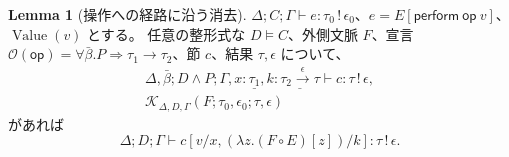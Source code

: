 \documentclass[a4paper,11pt]{article}
\theoremstyle{definition}
\newtheorem{lemma}[definition]{Lemma}
\newcommand{\op}{\mathsf{op}}
\newcommand{\ops}{\mathcal O}
\newcommand{\arr}[3]{#1\xrightarrow{#2}#3}
\newcommand{\jj}[6]{#1;#2;#3\vdash #4:#5\,!\,#6}
\newcommand{\J}[3]{\jj{\Delta}{C}{\Gamma}{#1}{#2}{#3}}
\newcommand{\perform}[2]{\mathsf{perform}\ #1\ #2}
\newcommand{\mono}[1]{\underline{#1}}
\newcommand{\Val}{\operatorname{Value}}
\newcommand{\proofspace}{\Needspace{16\baselineskip}}
\begin{document}
\proofspace
\begin{samepage}
\begin{lemma}[操作への経路に沿う消去]\label{lem:op-elim}
$\J e{\tau_0}{\epsilon_0}$、$e=E[\perform\op v]$、$\Val(v)$ とする。
任意の整形式な $D\models C$、外側文脈 $F$、宣言
$\ops(\op)=\forall\bar\beta.P\Rightarrow\tau_1\to\tau_2$、節 $c$、結果 $\tau,\epsilon$ について、
\begin{gather*}
 \jj{\Delta,\bar\beta}{D\land P}
 {\Gamma,x:\mono{\tau_1},k:\mono{\arr{\tau_2}\epsilon\tau}}c\tau\epsilon,\\
 \mathcal K_{\Delta,D,\Gamma}(F;\tau_0,\epsilon_0;\tau,\epsilon)
\end{gather*}
があれば
\begin{equation}\label{eq:op-elim}
 \jj\Delta D\Gamma
 {c[v/x,(\lambda z.(F\circ E)[z])/k]}\tau\epsilon.
\end{equation}
\end{lemma}
\end{samepage}
\nopagebreak[4]
\end{document}
